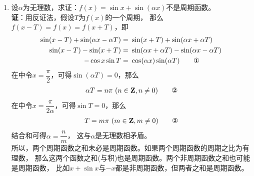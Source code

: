 \begin{enumerate}[label={【\textbf{例\thechapter.\arabic*}】},
 leftmargin=\inteval{\myenumleftmargin}pt,
 itemsep=\inteval{\myenumitempsep}pt,
 itemindent=\inteval{\myenumitemindent}pt]
\item 设$\alpha$为无理数，求证：$f(x)=\sin x+\sin(\alpha x)$不是周期函数。\\
\textbf{证}：用反证法，假设$T$为$f(x)$的一个周期，
那么$f(x-T)=f(x)=f(x+T)$，即
\begin{align*}
    \sin(x-T)+\sin(\alpha x-\alpha T)=&\ 
    \sin(x+T)+\sin(\alpha x+\alpha T) \\
    \sin(x-T)-\sin(x+T)=&\ 
    \sin(\alpha x+\alpha T)-\sin(\alpha x-\alpha T) \\
    -\cos x\sin T=&\ \cos(\alpha x)\sin(\alpha T) \tag*{}
\end{align*}
在\ding{172}中令$x=\dfrac{\pi}{2}$，可得$ \sin(\alpha T)=0 $，那么
\begin{gather*}
    \alpha T=n\pi\ (n\in\mathbf{Z},n\neq 0)  \tag*{\ding{173}}
\end{gather*}
在\ding{172}中令$x=\dfrac{\pi}{2\alpha}$，可得$ \sin T=0 $，那么
\begin{gather*}
    T=m\pi\ (m\in\mathbf{Z},m\neq 0) \tag*{}
\end{gather*}
结合\ding{173}和\ding{174}可得$\alpha=\dfrac{n}{m}$，
这与$\alpha$是无理数相矛盾。\\
所以，两个周期函数之和未必是周期函数。如果两个周期函数的周期之比为有理数，
那么这两个函数之和(与积)也是周期函数。两个非周期函数之和也可能是周期函数，
比如$x+\sin x$与$-x$都是非周期函数，但两者之和是周期函数。


\end{enumerate}
